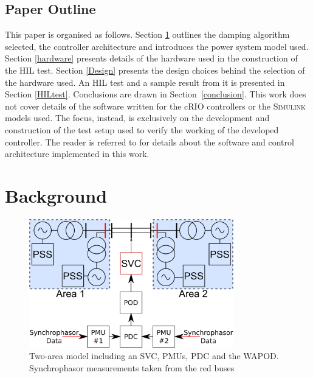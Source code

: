 \documentclass[conference]{IEEEtran}
\begin{document}
\subsection{Paper Outline}
This paper is organised as follows. Section \ref{background} outlines the damping algorithm selected, the controller architecture and introduces the power system model used. Section \ref{hardware} presents details of the hardware used in the construction of the HIL test. Section \ref{Design} presents the design choices behind the selection of the hardware used. An HIL test and a sample result from it is presented in Section \ref{HILtest}. Conclusions are drawn in Section~\ref{conclusion}. This work does not cover details of the software written for the cRIO controllers or the \textsc{Simulink} models used. The focus, instead, is exclusively on the development and construction of the test setup used to verify the working of the developed controller. The reader is referred to \cite{Rebello} for details about the software and control architecture implemented in this work.

\section{Background}\label{background}

\begin{figure}[!h]
\centering
\includegraphics[width=3.5in]{TwoArea.pdf} 
\caption{Two-area model including an SVC, PMUs, PDC and the WAPOD. Synchrophasor measurements taken from the red buses}
\label{TwoArea}
\end{figure}
\end{document}
